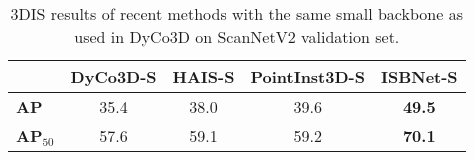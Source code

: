 \documentclass[10pt,twocolumn,letterpaper]{article}
\begin{document}
\begin{table}
    \small
    \centering
    \begin{tabular}{lcccc}
    \toprule
                & DyCo3D-S     & HAIS-S     & PointInst3D-S & \textbf{ISBNet-S} \\ 
    \midrule
    \textbf{AP} & 35.4 & 38.0 & 39.6 & \textbf{49.5} \\
    \textbf{AP$_{50}$} & 57.6 & 59.1   & 59.2 & \textbf{70.1}  \\
    \bottomrule
    \end{tabular}      
    \vspace{-4pt}
    \caption{3DIS results of recent methods with the same small backbone as used in DyCo3D on ScanNetV2 validation set.}
    \vspace{-17pt}
    \label{tab:abl_smallbb}
\end{table}
\end{document}
